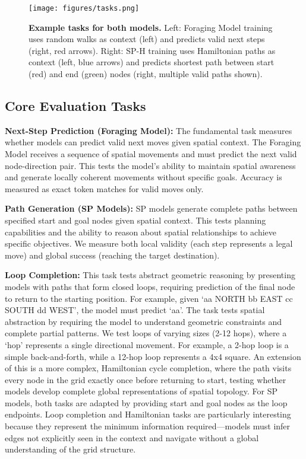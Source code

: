 \begin{figure*}[t]
\centering
\texttt{[image: figures/tasks.png]}
\caption[Example tasks for both models.]{
\textbf{Example tasks for both models.} Left: Foraging Model training uses random walks as context (left) and predicts valid next steps (right, red arrows). Right: SP-H training uses Hamiltonian paths as context (left, blue arrows) and predicts shortest path between start (red) and end (green) nodes (right, multiple valid paths shown). }
\label{fig:model_tasks_and_behaviour}
\end{figure*}


\subsection{Core Evaluation Tasks}

\textbf{Next-Step Prediction (Foraging Model):} The fundamental task measures whether models can predict valid next moves given spatial context. The Foraging Model receives a sequence of spatial movements and must predict the next valid node-direction pair. This tests the model's ability to maintain spatial awareness and generate locally coherent movements without specific goals. Accuracy is measured as exact token matches for valid moves only.

\textbf{Path Generation (SP Models):} SP models generate complete paths between specified start and goal nodes given spatial context. This tests planning capabilities and the ability to reason about spatial relationships to achieve specific objectives. We measure both local validity (each step represents a legal move) and global success (reaching the target destination).

\textbf{Loop Completion:} This task tests abstract geometric reasoning by presenting models with paths that form closed loops, requiring prediction of the final node to return to the starting position. For example, given `aa NORTH bb EAST cc SOUTH dd WEST', the model must predict `aa'. The task tests spatial abstraction by requiring the model to understand geometric constraints and complete partial patterns. We test loops of varying sizes (2-12 hops), where a `hop' represents a single directional movement. For example, a 2-hop loop is a simple back-and-forth, while a 12-hop loop represents a 4x4 square. An extension of this is a more complex,  Hamiltonian cycle completion, where the path visits every node in the grid exactly once before returning to start, testing whether models develop complete global representations of spatial topology. For SP models, both tasks are adapted by providing start and goal nodes as the loop endpoints. Loop completion and Hamiltonian tasks are particularly interesting because they represent the minimum information required—models must infer edges not explicitly seen in the context and navigate without a global understanding of the grid structure.

